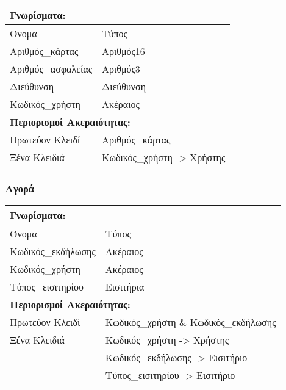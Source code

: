 \begin{tabular}{|p{6cm}|p{8cm}|}
  \multicolumn{2}{l}{\textbf{Γνωρίσματα:}}               \\ \hline
  Όνομα              & Τύπος                             \\ \hline
  Αριθμός\_κάρτας    & Αριθμός16                         \\ \hline
  Αριθμός\_ασφαλείας & Αριθμός3                          \\ \hline
  Διεύθυνση          & Διεύθυνση                         \\ \hline
  Κωδικός\_χρήστη    & Ακέραιος                          \\ \hline
  \multicolumn{2}{l}{\textbf{Περιορισμοί Ακεραιότητας:}} \\ \hline
  Πρωτεύον Κλειδί    & Αριθμός\_κάρτας                   \\ \hline
  Ξένα Κλειδιά       & Κωδικός\_χρήστη -> Χρήστης        \\ \hline
\end{tabular}

\subsubsection*{Αγορά}

\begin{tabular}{|p{6cm}|p{8cm}|}
  \multicolumn{2}{l}{\textbf{Γνωρίσματα:}}                   \\ \hline
  Όνομα              & Τύπος                                 \\ \hline
  Κωδικός\_εκδήλωσης & Ακέραιος                              \\ \hline
  Κωδικός\_χρήστη    & Ακέραιος                              \\ \hline
  Τύπος\_εισιτηρίου  & Εισιτήρια                             \\ \hline
  \multicolumn{2}{l}{\textbf{Περιορισμοί Ακεραιότητας:}}     \\ \hline
  Πρωτεύον Κλειδί    & Κωδικός\_χρήστη \& Κωδικός\_εκδήλωσης \\ \hline
  Ξένα Κλειδιά       & Κωδικός\_χρήστη -> Χρήστης            \\ \hline
                     & Κωδικός\_εκδήλωσης -> Εισιτήριο       \\ \hline
                     & Τύπος\_εισιτηρίου -> Εισιτήριο        \\ \hline
\end{tabular}

